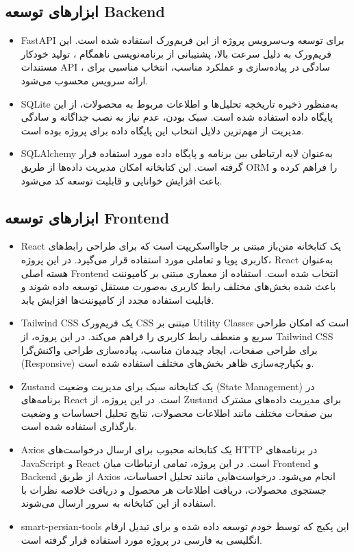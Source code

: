 \subsection{ابزارهای توسعه Backend}
\begin{itemize}
	\item FastAPI
	برای توسعه وب‌سرویس پروژه از این فریم‌ورک استفاده شده است. این فریم‌ورک به دلیل سرعت بالا، پشتیبانی از برنامه‌نویسی ناهمگام ، تولید خودکار مستندات API ، سادگی در پیاده‌سازی و عملکرد مناسب، انتخاب مناسبی برای ارائه سرویس محسوب می‌شود.
	\item SQLite
	به‌منظور ذخیره تاریخچه تحلیل‌ها و اطلاعات مربوط به محصولات، از این  پایگاه داده استفاده شده است. سبک بودن، عدم نیاز به نصب جداگانه و سادگی مدیریت از مهم‌ترین دلایل انتخاب این پایگاه داده برای پروژه بوده است.
	\item SQLAlchemy 
 به‌عنوان لایه ارتباطی بین برنامه و پایگاه داده مورد استفاده قرار گرفته است. این کتابخانه امکان مدیریت داده‌ها از طریق ORM را فراهم کرده و باعث افزایش خوانایی و قابلیت توسعه کد می‌شود.
\end{itemize}

\subsection{ابزارهای توسعه Frontend}
\begin{itemize}
	\item React
	یک کتابخانه متن‌باز مبتنی بر جاوااسکریپت است که برای طراحی رابط‌های کاربری پویا و تعاملی مورد استفاده قرار می‌گیرد. در این پروژه، React به‌عنوان هسته اصلی Frontend انتخاب شده است. استفاده از معماری مبتنی بر کامپوننت  باعث شده بخش‌های مختلف رابط کاربری به‌صورت مستقل توسعه داده شوند و قابلیت استفاده مجدد از کامپوننت‌ها افزایش یابد.
	\item Tailwind CSS
	یک فریم‌ورک CSS مبتنی بر Utility Classes است که امکان طراحی سریع و منعطف رابط کاربری را فراهم می‌کند. در این پروژه، از Tailwind CSS برای طراحی صفحات، ایجاد چیدمان مناسب، پیاده‌سازی طراحی واکنش‌گرا (Responsive) و یکپارچه‌سازی ظاهر بخش‌های مختلف استفاده شده است.
	\item Zustand
	یک کتابخانه سبک برای مدیریت وضعیت (State Management) در برنامه‌های React است. در این پروژه، از Zustand برای مدیریت داده‌های مشترک بین صفحات مختلف مانند اطلاعات محصولات، نتایج تحلیل احساسات و وضعیت بارگذاری استفاده شده است.
	\item Axios
	یک کتابخانه محبوب برای ارسال درخواست‌های HTTP در برنامه‌های JavaScript و React است. در این پروژه، تمامی ارتباطات میان Frontend و Backend از طریق Axios انجام می‌شود. درخواست‌هایی مانند تحلیل احساسات، جستجوی محصولات، دریافت اطلاعات هر محصول و دریافت خلاصه نظرات با استفاده از این کتابخانه به سرور ارسال می‌شوند.
	\item smart-persian-tools
	این پکیج که توسط خودم توسعه داده شده و برای تبدیل ارقام انگلیسی به فارسی در پروژه مورد استفاده قرار گرفته است.
\end{itemize}

